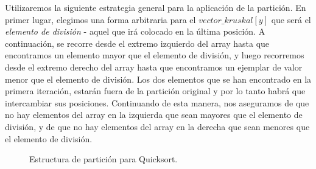 Utilizaremos la siguiente estrategia general para la aplicación de la partición. En primer lugar, elegimos una forma arbitraria para el $vector\_kruskal[y]$ que será el \emph{elemento de división} - aquel que irá colocado en la última posición. A continuación, se recorre desde el extremo izquierdo del array hasta que encontramos un elemento mayor que el elemento de división, y luego recorremos desde el extremo derecho del array hasta que encontramos un ejemplar de valor menor que el elemento de división. Los dos elementos que se han encontrado en la primera iteración, estarán fuera de la partición original y por lo tanto habrá que intercambiar sus posiciones. Continuando de esta manera, nos aseguramos de que no hay elementos del array en la izquierda que sean mayores que el elemento de división, y de que no hay elementos del array en la derecha que sean menores que el elemento de división. \\

\begin{center}%
\begin{figure}[H]%
\begin{minipage}[H]{1\columnwidth}%
\centering%
\caption{Estructura de partición para Quicksort.}%
\end{minipage}%
\end{figure}%
\end{center}%

